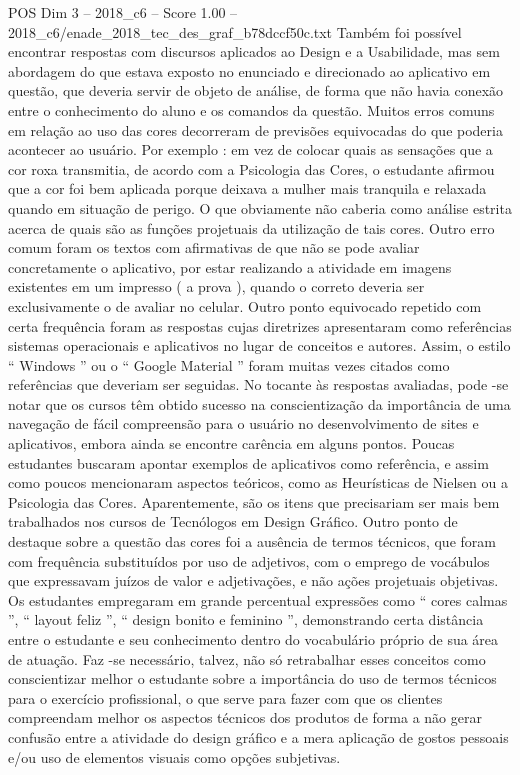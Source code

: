 \begin{textsample}{POS Dim 3 – 2018\_c6 – Score 1.00 – 2018\_c6/enade\_2018\_tec\_des\_graf\_b78dccf50c.txt}
Também foi possível encontrar respostas com discursos aplicados ao Design e a Usabilidade, mas sem abordagem do que estava exposto no enunciado e direcionado ao aplicativo em questão, que deveria servir de objeto de análise, de forma que não havia conexão entre o conhecimento do aluno e os comandos da questão.
Muitos erros comuns em relação ao uso das cores decorreram de previsões equivocadas do que poderia acontecer ao usuário.
Por exemplo : em vez de colocar quais as sensações que a cor roxa transmitia, de acordo com a Psicologia das Cores, o estudante afirmou que a cor foi bem aplicada porque deixava a mulher mais tranquila e relaxada quando em situação de perigo.
O que obviamente não caberia como análise estrita acerca de quais são as funções projetuais da utilização de tais cores.
Outro erro comum foram os textos com afirmativas de que não se pode avaliar concretamente o aplicativo, por estar realizando a atividade em imagens existentes em um impresso ( a prova ), quando o correto deveria ser exclusivamente o de avaliar no celular.
Outro ponto equivocado repetido com certa frequência foram as respostas cujas diretrizes apresentaram como referências sistemas operacionais e aplicativos no lugar de conceitos e autores.
Assim, o estilo “ Windows ” ou o “ Google Material ” foram muitas vezes citados como referências que deveriam ser seguidas.
No tocante às respostas avaliadas, pode -se notar que os cursos têm obtido sucesso na conscientização da importância de uma navegação de fácil compreensão para o usuário no desenvolvimento de sites e aplicativos, embora ainda se encontre carência em alguns pontos.
Poucas estudantes buscaram apontar exemplos de aplicativos como referência, e assim como poucos mencionaram aspectos teóricos, como as Heurísticas de Nielsen ou a Psicologia das Cores.
Aparentemente, são os itens que precisariam ser mais bem trabalhados nos cursos de Tecnólogos em Design Gráfico.
Outro ponto de destaque sobre a questão das cores foi a ausência de termos técnicos, que foram com frequência substituídos por uso de adjetivos, com o emprego de vocábulos que expressavam juízos de valor e adjetivações, e não ações projetuais objetivas.
Os estudantes empregaram em grande percentual expressões como “ cores calmas ”, “ layout feliz ”, “ design bonito e feminino ”, demonstrando certa distância entre o estudante e seu conhecimento dentro do vocabulário próprio de sua área de atuação.
Faz -se necessário, talvez, não só retrabalhar esses conceitos como conscientizar melhor o estudante sobre a importância do uso de termos técnicos para o exercício profissional, o que serve para fazer com que os clientes compreendam melhor os aspectos técnicos dos produtos de forma a não gerar confusão entre a atividade do design gráfico e a mera aplicação de gostos pessoais e/ou uso de elementos visuais como opções subjetivas.

\end{textsample}
